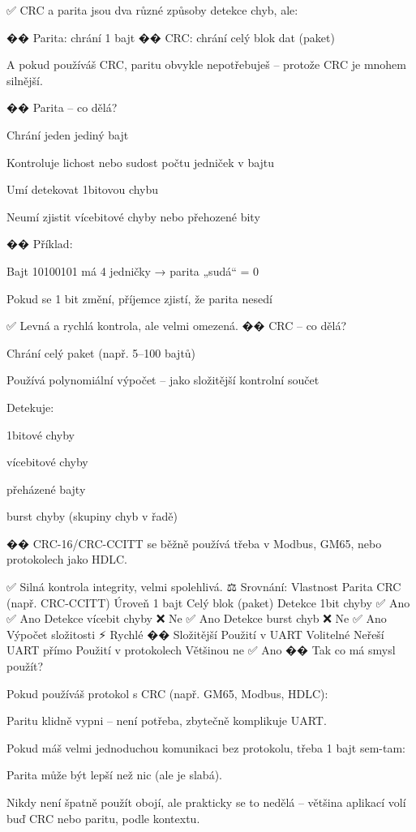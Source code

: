     ✅ CRC a parita jsou dva různé způsoby detekce chyb, ale:

    �� Parita: chrání 1 bajt
    �� CRC: chrání celý blok dat (paket)

    A pokud používáš CRC, paritu obvykle nepotřebuješ – protože CRC je mnohem silnější.

�� Parita – co dělá?

    Chrání jeden jediný bajt

    Kontroluje lichost nebo sudost počtu jedniček v bajtu

    Umí detekovat 1bitovou chybu

    Neumí zjistit vícebitové chyby nebo přehozené bity

�� Příklad:

    Bajt 10100101 má 4 jedničky → parita „sudá“ = 0

    Pokud se 1 bit změní, příjemce zjistí, že parita nesedí

✅ Levná a rychlá kontrola, ale velmi omezená.
�� CRC – co dělá?

    Chrání celý paket (např. 5–100 bajtů)

    Používá polynomiální výpočet – jako složitější kontrolní součet

    Detekuje:

        1bitové chyby

        vícebitové chyby

        přeházené bajty

        burst chyby (skupiny chyb v řadě)

�� CRC-16/CRC-CCITT se běžně používá třeba v Modbus, GM65, nebo protokolech jako HDLC.

✅ Silná kontrola integrity, velmi spolehlivá.
⚖️ Srovnání:
Vlastnost	Parita	CRC (např. CRC-CCITT)
Úroveň	1 bajt	Celý blok (paket)
Detekce 1bit chyby	✅ Ano	✅ Ano
Detekce vícebit chyby	❌ Ne	✅ Ano
Detekce burst chyb	❌ Ne	✅ Ano
Výpočet složitosti	⚡ Rychlé	�� Složitější
Použití v UART	Volitelné	Neřeší UART přímo
Použití v protokolech	Většinou ne	✅ Ano
�� Tak co má smysl použít?

    Pokud používáš protokol s CRC (např. GM65, Modbus, HDLC):

        Paritu klidně vypni – není potřeba, zbytečně komplikuje UART.

    Pokud máš velmi jednoduchou komunikaci bez protokolu, třeba 1 bajt sem-tam:

        Parita může být lepší než nic (ale je slabá).

    Nikdy není špatně použít obojí, ale prakticky se to nedělá – většina aplikací volí buď CRC nebo paritu, podle kontextu.

